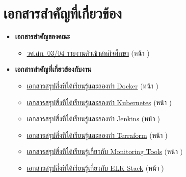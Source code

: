 \chapter{เอกสารสำคัญที่เกี่ยวข้อง}
\begin{itemize}
    \item \textbf{เอกสารสำคัญของคณะ}
          \begin{itemize}
              \item \hyperlink{target:03-04}{วศ.สก.-03/04 รายงานตัวเข้าสหกิจศึกษา} (หน้า \pageref{page:03-04})
          \end{itemize}
    \item \textbf{เอกสารสำคัญที่เกี่ยวข้องกับงาน}
          \begin{itemize}
              \item \hyperlink{target:docker}{เอกสารสรุปสิ่งที่ได้เรียนรู้และลองทำ Docker} (หน้า \pageref{page:docker})
              \item \hyperlink{target:kube}{เอกสารสรุปสิ่งที่ได้เรียนรู้และลองทำ Kubernetes} (หน้า \pageref{page:kube})
              \item \hyperlink{target:jenkins}{เอกสารสรุปสิ่งที่ได้เรียนรู้และลองทำ Jenkins} (หน้า \pageref{page:jenkins})
              \item \hyperlink{target:terraform}{เอกสารสรุปสิ่งที่ได้เรียนรู้และลองทำ Terraform} (หน้า \pageref{page:terraform})
              \item \hyperlink{target:monitoring}{เอกสารสรุปสิ่งที่ได้เรียนรู้เกี่ยวกับ Monitoring Tools} (หน้า \pageref{page:monitoring})
              \item \hyperlink{target:elk}{เอกสารสรุปสิ่งที่ได้เรียนรู้เกี่ยวกับ ELK Stack} (หน้า \pageref{page:elk})
          \end{itemize}
\end{itemize}








